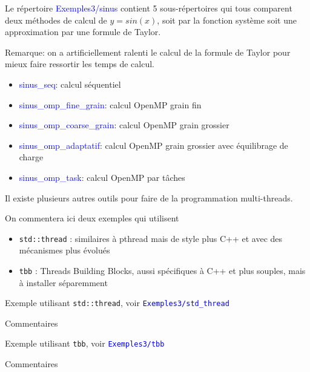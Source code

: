\documentclass{beamer}
\begin{document}
\begin{frame}
	Le répertoire \textcolor{blue}{Exemples3/sinus} contient 5 sous-répertoires
	qui tous comparent deux méthodes de calcul de $y=sin(x)$, soit par la fonction système soit une approximation par une formule de Taylor.
	\medskip
	
	Remarque: on a artificiellement ralenti le calcul de la formule de Taylor pour mieux faire ressortir les temps de calcul.
	
	\begin{itemize}
		\item \textcolor{blue}{sinus\_seq}: calcul séquentiel
		\item \textcolor{blue}{sinus\_omp\_fine\_grain}: calcul OpenMP grain fin
		\item \textcolor{blue}{sinus\_omp\_coarse\_grain}: calcul OpenMP grain grossier
		\item \textcolor{blue}{sinus\_omp\_adaptatif}: calcul OpenMP grain grossier avec équilibrage de charge
		\item \textcolor{blue}{sinus\_omp\_task}: calcul OpenMP par tâches
	\end{itemize}

\vfill

\end{frame}

\begin{frame}

Il existe plusieurs autres outils pour faire de la programmation multi-threads.
\bigskip

On commentera ici deux exemples qui utilisent 
\begin{itemize}
	\item{\tt std::thread} : similaires à pthread mais de style plus C++ et avec des mécanismes plus évolués
	\item {\tt tbb} : Threads Building Blocks, aussi spécifiques à C++ et plus souples, mais à installer séparemment
\end{itemize} 
\end{frame}

\begin{frame}
Exemple utilisant {\tt std::thread}, voir \textcolor{blue}{\tt Exemples3/std\_thread}
\bigskip

Commentaires
\end{frame}

\begin{frame}
Exemple utilisant {\tt tbb}, voir \textcolor{blue}{\tt Exemples3/tbb}
\bigskip

Commentaires
\end{frame}
\end{document}

